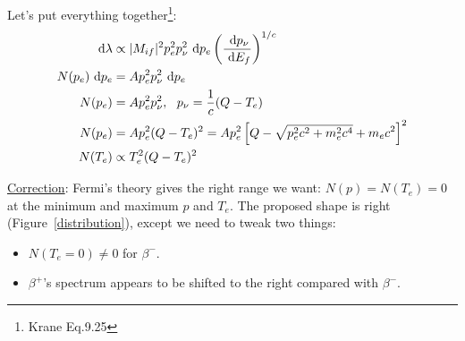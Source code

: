 \documentclass{school-22.101-notes}
\begin{document}
Let's put everything together\footnote{Krane Eq.9.25}: 
\begin{align}
\mbox{ }\mathrm{d} \lambda &\propto |M_{if}|^2 p_{e}^2 p_{\nu}^2 \mbox{ }\mathrm{d} p_{e} \left(\frac{\mbox{ }\mathrm{d} p_{\nu}}{\mbox{ }\mathrm{d} E_f} \right)^{1/c} \\
N(p_{e}) \mbox{ }\mathrm{d} p_{e} &= A p_{e}^2 p_{\nu}^2 \mbox{ }\mathrm{d} p_{e} \\
N(p_{e}) &= A p_{e}^2 p_{\nu}^2, \mbox{ } \mbox{ } p_{\nu} =\frac{1}{c} (Q - T_{e}) \\
N(p_{e}) &= A p_{e}^2 (Q - T_{e})^2  = A p_{e}^2 \left[ Q - \sqrt{p_{e}^2 c^2 + m_e^2 c^4} + m_e c^2 \right]^2 \\
N(T_{e}) &\propto T_{e}^2 (Q - T_{e})^2
\end{align}

\uline{Correction}: Fermi's theory gives the right range we want: $N(p) = N(T_e) = 0$ at the minimum and maximum $p$ and $T_e$. The proposed shape is right (Figure~\ref{distribution}), except we need to tweak two things: 
\begin{itemize}
\item $N(T_e = 0) \neq 0$ for $\beta^-$. 
\item $\beta^+$'s spectrum appears to be shifted to the right compared with $\beta^-$. 
\end{itemize} 
\end{document}
